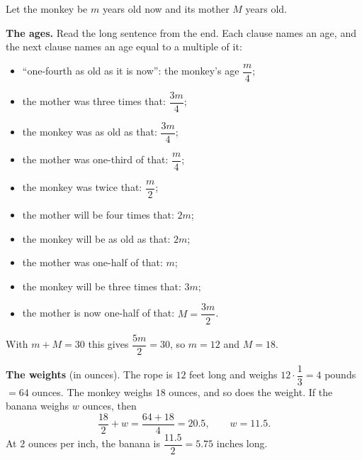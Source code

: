 Let the monkey be $m$ years old now and its mother $M$ years old.

\textbf{The ages.} Read the long sentence from the end. Each clause names an age, and the next clause names an age equal to a multiple of it:
\begin{itemize}
\item ``one-fourth as old as it is now'': the monkey's age $\dfrac {m}{4}$;
\item the mother was three times that: $\dfrac{3m}{4}$;
\item the monkey was as old as that: $\dfrac{3m}{4}$;
\item the mother was one-third of that: $\dfrac {m}{4}$;
\item the monkey was twice that: $\dfrac {m}{2}$;
\item the mother will be four times that: $2m$;
\item the monkey will be as old as that: $2m$;
\item the mother was one-half of that: $m$;
\item the monkey will be three times that: $3m$;
\item the mother is now one-half of that: $M=\dfrac{3m}{2}$.
\end{itemize}
With $m+M=30$ this gives $\dfrac{5m}{2}=30$, so $m=12$ and $M=18$.

\textbf{The weights} (in ounces). The rope is $12$ feet long and weighs $12\cdot\dfrac{1}{3}=4$ pounds $=64$ ounces. The monkey weighs $18$ ounces, and so does the weight. If the banana weighs $w$ ounces, then
\[
\dfrac{18}{2}+w=\dfrac{64+18}{4}=20.5,\qquad w=11.5 .
\]
At $2$ ounces per inch, the banana is $\dfrac{11.5}{2}=\boxed{5.75\text{ inches}}$ long.
